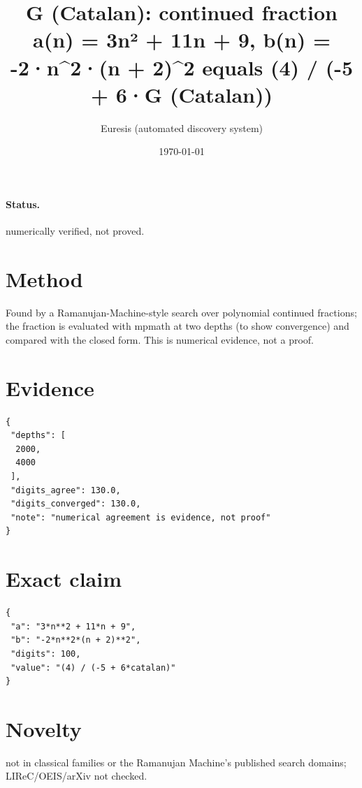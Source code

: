 \documentclass[11pt]{article}
\title{G (Catalan): continued fraction a(n) = 3n² + 11n + 9, b(n) = -2·n\^{}2·(n + 2)\^{}2 equals (4) / (-5 + 6·G (Catalan))}
\author{Euresis (automated discovery system)}
\date{\today}
\begin{document}
\maketitle
\paragraph{Status.} numerically verified, not proved.
\section{Method}
Found by a Ramanujan-Machine-style search over polynomial continued fractions; the fraction is evaluated with mpmath at two depths (to show convergence) and compared with the closed form. This is numerical evidence, not a proof.
\section{Evidence}
\begin{verbatim}
{
 "depths": [
  2000,
  4000
 ],
 "digits_agree": 130.0,
 "digits_converged": 130.0,
 "note": "numerical agreement is evidence, not proof"
}
\end{verbatim}
\section{Exact claim}
\begin{verbatim}
{
 "a": "3*n**2 + 11*n + 9",
 "b": "-2*n**2*(n + 2)**2",
 "digits": 100,
 "value": "(4) / (-5 + 6*catalan)"
}
\end{verbatim}
\section{Novelty}
not in classical families or the Ramanujan Machine's published search domains; LIReC/OEIS/arXiv not checked.
\end{document}
